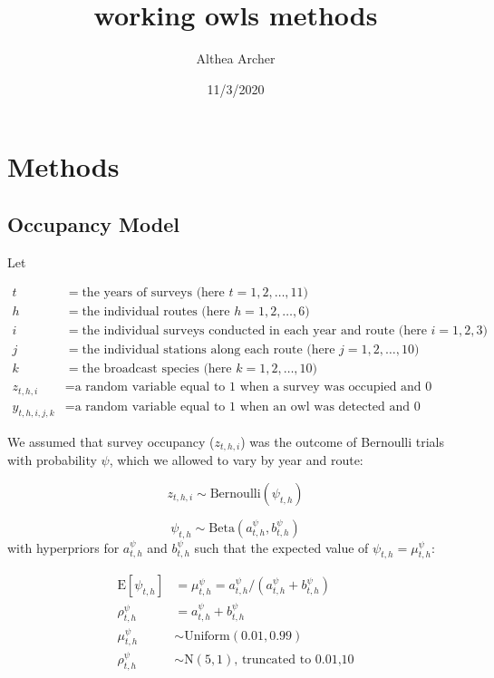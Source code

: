 \documentclass[]{article}
\title{working owls methods}
\author{Althea Archer}
\date{11/3/2020}
\begin{document}
\maketitle

\section{Methods}\label{methods}

\subsection{Occupancy Model}\label{occupancy-model}

Let

\[
\begin{aligned}
t  &=  \text{the years of surveys (here }t = 1,2,\ldots,11)\\
h  &=  \text{the individual routes (here }h = 1,2,\ldots,6)\\
i  &=  \text{the individual surveys conducted in each year and route (here }i = 1,2,3)\\
j  &=  \text{the individual stations along each route (here }j = 1,2,\ldots,10)\\
k  &=  \text{the broadcast species (here }k = 1,2,\ldots,10)\\
z_{t,h,i} &= \text{a random variable equal to 1 when a survey was occupied and 0 otherwise}\\
y_{t,h,i,j,k} &= \text{a random variable equal to 1 when an owl was detected and 0 otherwise}
\end{aligned}
\]

We assumed that survey occupancy (\(z_{t,h,i}\)) was the outcome of
Bernoulli trials with probability \(\psi\), which we allowed to vary by
year and route:

\[
z_{t,h,i} \sim \text{Bernoulli}(\psi_{t,h})
\]

\[
\psi_{t,h} \sim \text{Beta}(a^\psi_{t,h},b^\psi_{t,h})
\] with hyperpriors for \(a^\psi_{t,h}\) and \(b^\psi_{t,h}\) such that
the expected value of \(\psi_{t,h} = \mu^\psi_{t,h}\):

\[
\begin{aligned}
\text{E}[\psi_{t,h}] &= \mu^\psi_{t,h} = a^\psi_{t,h}/(a^\psi_{t,h}+b^\psi_{t,h})\\
\rho^\psi_{t,h} &= a^\psi_{t,h}+b^\psi_{t,h}\\
\mu^\psi_{t,h} &\sim \text{Uniform}(0.01, 0.99)\\
\rho^\psi_{t,h} &\sim \text{N}(5,1)\text{, truncated to 0.01,10}\\
\end{aligned}
\]
\end{document}

